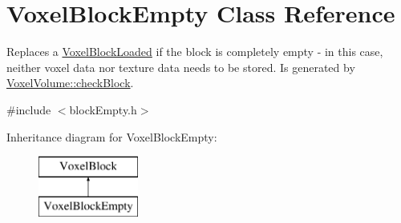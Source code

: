 \hypertarget{classVoxelBlockEmpty}{
\section{\-Voxel\-Block\-Empty \-Class \-Reference}
\label{d1/dee/classVoxelBlockEmpty}
}


\-Replaces a \hyperlink{classVoxelBlockLoaded}{\-Voxel\-Block\-Loaded} if the block is completely empty -\/ in this case, neither voxel data nor texture data needs to be stored. \-Is generated by \hyperlink{classVoxelVolume_a0a1e8cdc7c5c2ba73b08e3418579efce}{\-Voxel\-Volume\-::check\-Block}.  




{\ttfamily \#include $<$block\-Empty.\-h$>$}

\-Inheritance diagram for \-Voxel\-Block\-Empty\-:\begin{figure}[H]
\begin{center}
\leavevmode
\includegraphics[height=2.000000cm]{d1/dee/classVoxelBlockEmpty}
\end{center}
\end{figure}
